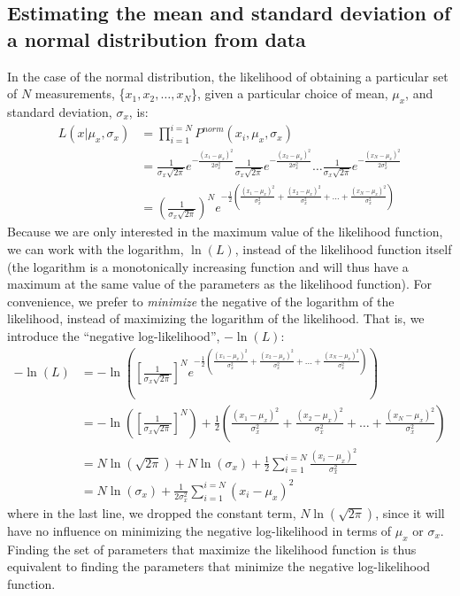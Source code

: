 \subsection{Estimating the mean and standard deviation of a normal distribution from data}
 In the case of the normal distribution, the likelihood of obtaining a particular set of $N$ measurements, \{$x_1, x_2, \dots,x_N$\}, given a particular choice of mean, $\mu_x$, and standard deviation, $\sigma_x$, is:
\begin{align}
L(x|\mu_x,\sigma_x)&=\prod_{i=1}^{i=N}P^{norm}(x_i,\mu_x,\sigma_x)\nonumber\\
&=\frac{1}{\sigma_x\sqrt{2\pi}}e^{-\frac{(x_1-\mu_x)^2}{2\sigma_x^2}}\frac{1}{\sigma_x\sqrt{2\pi}}e^{-\frac{(x_2-\mu_x)^2}{2\sigma_x^2}}\dots \frac{1}{\sigma_x\sqrt{2\pi}}e^{-\frac{(x_N-\mu_x)^2}{2\sigma_x^2}}\nonumber\\
&=\left(\frac{1}{\sigma_x\sqrt{2\pi}}\right)^N e^{-\frac{1}{2}\left(\frac{(x_1-\mu_x)^2}{\sigma_x^2}+\frac{(x_2-\mu_x)^2}{\sigma_x^2}+\dots +\frac{(x_N-\mu_x)^2}{\sigma_x^2}\right)}
\end{align}
Because we are only interested in the maximum value of the likelihood function, we can work with the logarithm, $\ln(L)$, instead of the likelihood function itself (the logarithm is a monotonically increasing function and will thus have a maximum at the same value of the parameters as the likelihood function). For convenience, we prefer to \textit{minimize} the negative of the logarithm of the likelihood, instead of maximizing the logarithm of the likelihood. That is, we introduce the ``negative log-likelihood'', $-\ln(L)$:
\begin{align}
-\ln(L)&=-\ln\left( \left[\frac{1}{\sigma_x\sqrt{2\pi}}\right]^N e^{-\frac{1}{2}\left(\frac{(x_1-\mu_x)^2}{\sigma_x^2}+\frac{(x_2-\mu_x)^2}{\sigma_x^2}+\dots +\frac{(x_N-\mu_x)^2}{\sigma_x^2}\right)}  \right)\nonumber\\
&=-\ln\left(\left[\frac{1}{\sigma_x\sqrt{2\pi}}\right]^N\right)+\frac{1}{2}\left(\frac{(x_1-\mu_x)^2}{\sigma_x^2}+\frac{(x_2-\mu_x)^2}{\sigma_x^2}+\dots +\frac{(x_N-\mu_x)^2}{\sigma_x^2}\right)  \nonumber\\
&=N\ln(\sqrt{2\pi})+N\ln(\sigma_x)+\frac{1}{2}\sum_{i=1}^{i=N}\frac{(x_i-\mu_x)^2}{\sigma_x^2}\nonumber\\
&=N\ln(\sigma_x)+\frac{1}{2\sigma_x^2}\sum_{i=1}^{i=N}(x_i-\mu_x)^2
\end{align}
where in the last line, we dropped the constant term, $N\ln(\sqrt{2\pi})$, since it will have no influence on minimizing the negative log-likelihood in terms of $\mu_x$ or $\sigma_x$. Finding the set of parameters that maximize the likelihood function is thus equivalent to finding the parameters that minimize the negative log-likelihood function.  

